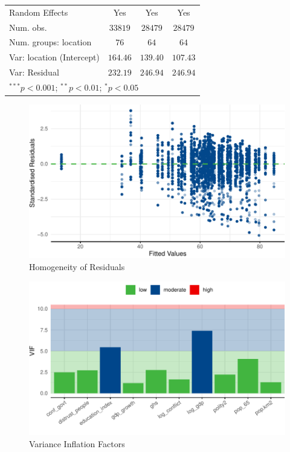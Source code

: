 \documentclass[
  12pt,
]{article}
\begin{document}
\begin{table}
\begin{center}
\begin{small}
\begin{tabular}{l c c c}
\hline
Random Effects               & Yes        & Yes        & Yes          \\
Num. obs.                    & $33819$    & $28479$    & $28479$      \\
Num. groups: location        & $76$       & $64$       & $64$         \\
Var: location (Intercept)    & $164.46$   & $139.40$   & $107.43$     \\
Var: Residual                & $232.19$   & $246.94$   & $246.94$     \\
\hline
\multicolumn{4}{l}{\tiny{$^{***}p<0.001$; $^{**}p<0.01$; $^{*}p<0.05$}}
\end{tabular}
\end{small}
\label{tab:obs-test}
\end{center}
\end{table}

\begin{figure}
\includegraphics[width=0.8\linewidth]{write_up_test_files/figure-latex/homo-1} \caption{Homogeneity of Residuals}\label{fig:homo}
\end{figure}

\begin{figure}
\includegraphics[width=0.8\linewidth]{write_up_test_files/figure-latex/vif-1} \caption{Variance Inflation Factors}\label{fig:vif}
\end{figure}
\end{document}
